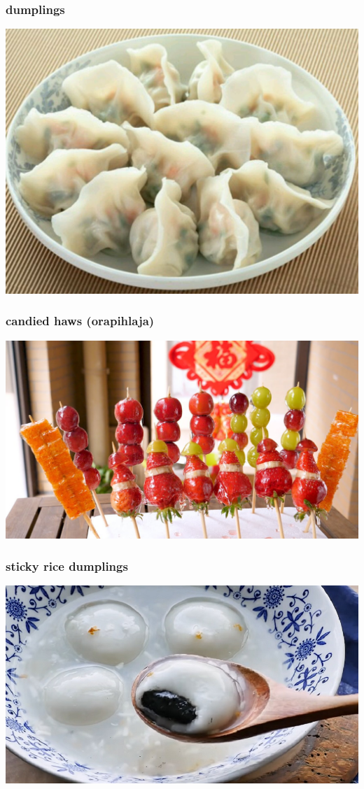 \documentclass[17pt]{beamer}
\begin{document}
\begin{frame}
  \frametitle{dumplings}
  \begin{center}
    \includegraphics[height=.6\textheight]{./images/jiaozi}
  \end{center}  
\end{frame}

\begin{frame}
  \frametitle{candied haws (orapihlaja)}
    \begin{center}
    \includegraphics[height=.6\textheight]{./images/tanghulu}
  \end{center}
\end{frame}

\begin{frame}
  \frametitle{sticky rice dumplings}
      \begin{center}
    \includegraphics[height=.6\textheight]{./images/tangyuan}
  \end{center}
\end{frame}
\end{document}
